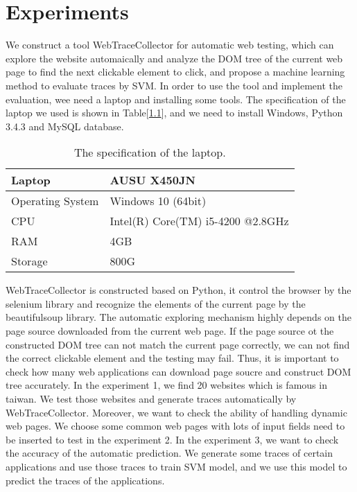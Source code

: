 
\chapter{Experiments}\label{ch:experiments}

We construct a tool WebTraceCollector for automatic web testing,
which can explore the website automaically and 
analyze the DOM tree of the current web page to find the next clickable element to click,
and propose a machine learning method to evaluate traces by SVM.
In order to use the tool and implement the evaluation, wee need a laptop and installing some tools.
The specification of the laptop we used is shown in Table[\ref{laptopSpec}],
and we need to install Windows, Python 3.4.3 and MySQL database.

\begin{table}[ht]
	\begin{center}
		\begin{tabular}{| l | l | }
			\hline
			Laptop & AUSU X450JN \\ \hline
			Operating System & Windows 10 (64bit) \\ \hline
			CPU & Intel(R) Core(TM) i5-4200 @2.8GHz \\ \hline
			RAM & 4GB \\ \hline
			Storage & 800G \\ \hline
		\end{tabular}
		\caption{ The specification of the laptop. }
		\label{laptopSpec}
	\end{center}
\end{table}

WebTraceCollector is constructed based on Python,
it control the browser by the selenium library and recognize the elements of the current page by the beautifulsoup library.
The automatic exploring mechanism highly depends on the page source downloaded from the current web page.
If the page source ot the constructed DOM tree can not match the current page correctly,
we can not find the correct clickable element and the testing may fail.
Thus, it is important to check how many web applications can download page soucre and construct DOM tree accurately.
In the experiment 1, we find 20 websites which is famous in taiwan.
We test those websites and generate traces automatically by WebTraceCollector.
Moreover, we want to check the ability of handling dynamic web pages.
We choose some common web pages with lots of input fields need to be inserted to test in the experiment 2.
In the experiment 3, we want to check the accuracy of the automatic prediction.
We generate some traces of certain applications and use those traces to train SVM model,
and we use this model to predict the traces of the applications.

